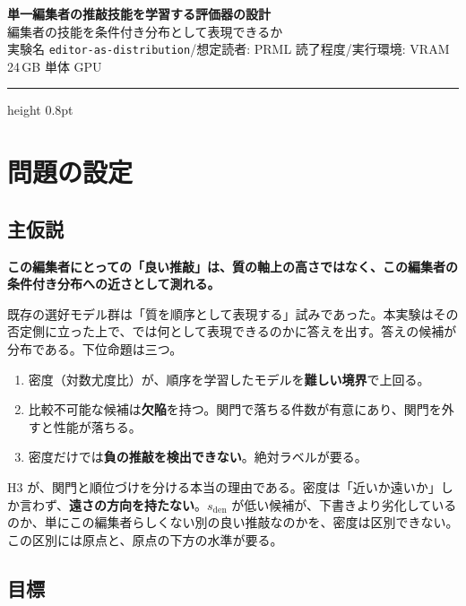 \documentclass[a4paper,10.5pt]{ltjsarticle}
\begin{document}
\begin{center}
{\sffamily\LARGE\bfseries 単一編集者の推敲技能を学習する評価器の設計}\\[5pt]
{\sffamily\normalsize\color{black!60} 編集者の技能を条件付き分布として表現できるか}\\[10pt]
{\sffamily\footnotesize\color{black!50} 実験名 \texttt{editor-as-distribution}\quad/\quad 想定読者: PRML 読了程度\quad/\quad 実行環境: VRAM 24\,GB 単体 GPU}
\end{center}

\vspace{2pt}
\hrule height 0.8pt
\vspace{10pt}

\section{問題の設定}

\subsection{主仮説}

\begin{keybox}[title=この実験が確かめること]
\textbf{この編集者にとっての「良い推敲」は、質の軸上の高さではなく、この編集者の条件付き分布への近さとして測れる。}
\end{keybox}

\noindent 既存の選好モデル群は「質を順序として表現する」試みであった。本実験はその否定側に立った上で、では何として表現できるのかに答えを出す。答えの候補が分布である。下位命題は三つ。

\begin{enumerate}
  \item[H1] 密度（対数尤度比）が、順序を学習したモデルを\textbf{難しい境界}で上回る。
  \item[H2] 比較不可能な候補は\textbf{欠陥}を持つ。関門で落ちる件数が有意にあり、関門を外すと性能が落ちる。
  \item[H3] 密度だけでは\textbf{負の推敲を検出できない}。絶対ラベルが要る。
\end{enumerate}

\noindent H3 が、関門と順位づけを分ける本当の理由である。密度は「近いか遠いか」しか言わず、\textbf{遠さの方向を持たない}。$s_{\mathrm{den}}$ が低い候補が、下書きより劣化しているのか、単にこの編集者らしくない別の良い推敲なのかを、密度は区別できない。この区別には原点と、原点の下方の水準が要る。

\subsection{目標}
\end{document}
